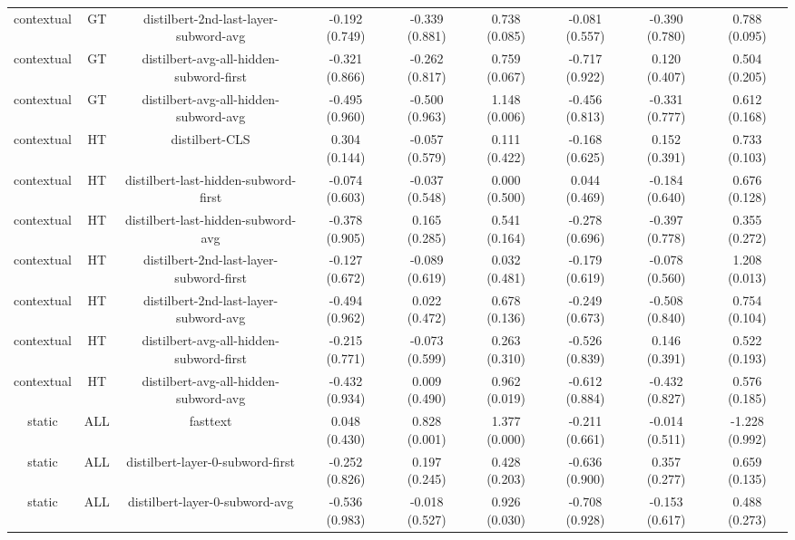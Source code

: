 \begin{sidewaystable}[htb]
\begin{tabular}{@{}ccccccccc@{}}
        contextual & GT & distilbert-2nd-last-layer-subword-avg & -0.192 (0.749) & -0.339 (0.881) & 0.738 (0.085) & -0.081 (0.557) & -0.390 (0.780) & 0.788 (0.095) \\
        contextual & GT & distilbert-avg-all-hidden-subword-first & -0.321 (0.866) & -0.262 (0.817) & 0.759 (0.067) & -0.717 (0.922) & 0.120 (0.407) & 0.504 (0.205) \\
        contextual & GT & distilbert-avg-all-hidden-subword-avg & -0.495 (0.960) & -0.500 (0.963) & 1.148 (0.006) & -0.456 (0.813) & -0.331 (0.777) & 0.612 (0.168) \\
        contextual & HT & distilbert-CLS & 0.304 (0.144) & -0.057 (0.579) & 0.111 (0.422) & -0.168 (0.625) & 0.152 (0.391) & 0.733 (0.103) \\
        contextual & HT & distilbert-last-hidden-subword-first & -0.074 (0.603) & -0.037 (0.548) & 0.000 (0.500) & 0.044 (0.469) & -0.184 (0.640) & 0.676 (0.128) \\
        contextual & HT & distilbert-last-hidden-subword-avg & -0.378 (0.905) & 0.165 (0.285) & 0.541 (0.164) & -0.278 (0.696) & -0.397 (0.778) & 0.355 (0.272) \\
        contextual & HT & distilbert-2nd-last-layer-subword-first & -0.127 (0.672) & -0.089 (0.619) & 0.032 (0.481) & -0.179 (0.619) & -0.078 (0.560) & 1.208 (0.013) \\
        contextual & HT & distilbert-2nd-last-layer-subword-avg & -0.494 (0.962) & 0.022 (0.472) & 0.678 (0.136) & -0.249 (0.673) & -0.508 (0.840) & 0.754 (0.104) \\
        contextual & HT & distilbert-avg-all-hidden-subword-first & -0.215 (0.771) & -0.073 (0.599) & 0.263 (0.310) & -0.526 (0.839) & 0.146 (0.391) & 0.522 (0.193) \\
        contextual & HT & distilbert-avg-all-hidden-subword-avg & -0.432 (0.934) & 0.009 (0.490) & 0.962 (0.019) & -0.612 (0.884) & -0.432 (0.827) & 0.576 (0.185) \\
        static & ALL & fasttext & 0.048 (0.430) & 0.828 (0.001) & 1.377 (0.000) & -0.211 (0.661) & -0.014 (0.511) & -1.228 (0.992) \\
        static & ALL & distilbert-layer-0-subword-first & -0.252 (0.826) & 0.197 (0.245) & 0.428 (0.203) & -0.636 (0.900) & 0.357 (0.277) & 0.659 (0.135) \\
        static & ALL & distilbert-layer-0-subword-avg & -0.536 (0.983) & -0.018 (0.527) & 0.926 (0.030) & -0.708 (0.928) & -0.153 (0.617) & 0.488 (0.273) \\

\end{tabular}
\end{sidewaystable}
